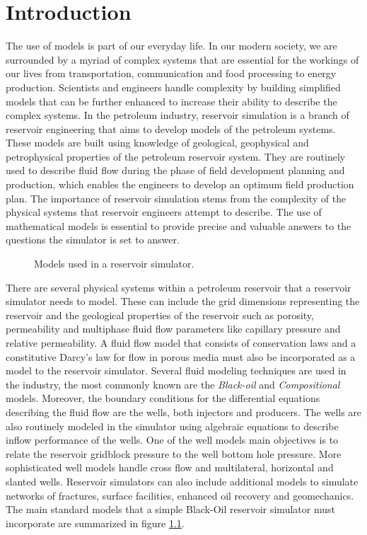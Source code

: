 \chapter{Introduction}
The use of models is part of our everyday life. In our modern society, we are surrounded by a myriad of complex systems that are
essential for the workings of our lives from transportation, communication and food processing to energy production. Scientists and engineers
handle complexity by building simplified models that can be further enhanced to increase their ability to describe the complex systems.
In the petroleum industry, reservoir simulation is a branch of reservoir engineering that aims to develop models of the petroleum systems.
These models are built using knowledge of geological, geophysical and petrophysical properties of the petroleum reservoir system.
They are routinely used to describe fluid flow during the phase of field development planning and production, which enables the engineers 
to develop an optimum field production plan. The importance of reservoir simulation stems from the complexity of the physical systems that reservoir 
engineers attempt to describe. The use of mathematical models is essential to provide precise and valuable answers to the questions the simulator is 
set to answer. 

\begin{figure}[htb]
\centering
\resizebox{15cm}{!}{}
\caption{Models used in a reservoir simulator.}\label{models}
\end{figure}

There are several physical systems within a petroleum reservoir that a reservoir simulator needs to model. 
These can include the grid dimensions representing the reservoir and the geological properties of the reservoir such as porosity, 
permeability and multiphase fluid flow parameters like capillary pressure and relative permeability. A fluid flow model that consists of 
conservation laws and a constitutive Darcy's law for flow in porous media must also be incorporated as a model to the reservoir simulator.
Several fluid modeling techniques are used in the industry, the most commonly known are the \textit{Black-oil} and \textit{Compositional} models.
Moreover, the boundary conditions for the differential equations describing the fluid flow are the wells, both injectors and producers. 
The wells are also routinely modeled in the simulator using algebraic equations to describe inflow performance of the wells. One of the well models
main objectives is to relate the reservoir gridblock pressure to the well bottom hole pressure. More sophisticated well models handle cross flow and
multilateral, horizontal and slanted wells. Reservoir simulators can also include additional models to simulate networks of fractures, surface facilities,
enhanced oil recovery and geomechanics. The main standard models that a simple Black-Oil reservoir simulator must incorporate are summarized in figure \ref{models}.

